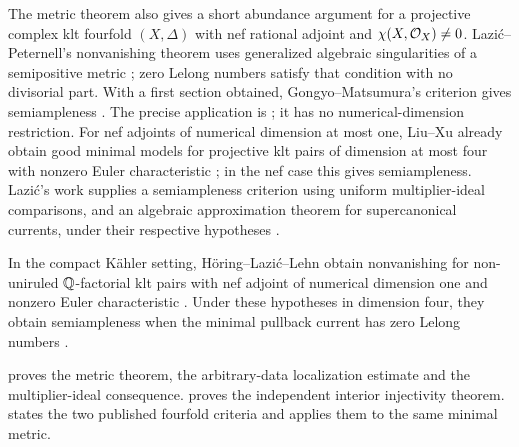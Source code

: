 The metric theorem also gives a short abundance argument for a
projective complex klt fourfold $(X,\Delta)$ with nef rational adjoint
and $\chi(X,\mathcal O_X)\ne0$. Lazi\'c--Peternell's nonvanishing theorem
uses generalized algebraic singularities of a semipositive metric
\cite[Corollary~D]{LazicPeternell2020}; zero Lelong numbers satisfy
that condition with no divisorial part. With a first section obtained,
Gongyo--Matsumura's criterion gives semiampleness
\cite[Corollary~5.3]{GongyoMatsumura2017}.
The precise application is ; it has no
numerical-dimension restriction. For nef adjoints of numerical dimension at most one,
Liu--Xu already obtain good minimal models for projective klt pairs
of dimension at most four with nonzero Euler characteristic
\cite[Corollary~5.2]{LiuXu2025}; in the nef case this gives
semiampleness. Lazi\'c's work supplies a semiampleness criterion using
uniform multiplier-ideal comparisons, and an algebraic approximation
theorem for supercanonical currents, under their respective hypotheses
\cite[Theorems~A--B]{Lazic2024Metrics}.

In the compact K\"ahler setting, H\"oring--Lazi\'c--Lehn obtain
nonvanishing for non-uniruled $\mathbb Q$-factorial klt pairs with nef adjoint
of numerical dimension one and nonzero Euler characteristic
\cite[Theorem~A]{HoringLazicLehn2025}. Under these hypotheses in
dimension four, they obtain semiampleness when the minimal pullback
current has zero Lelong numbers
\cite[Corollary~B]{HoringLazicLehn2025}.

 proves the metric theorem, the arbitrary-data
localization estimate and the multiplier-ideal consequence.
 proves the independent interior
injectivity theorem.  states the two published
fourfold criteria and applies them to the same minimal metric.
